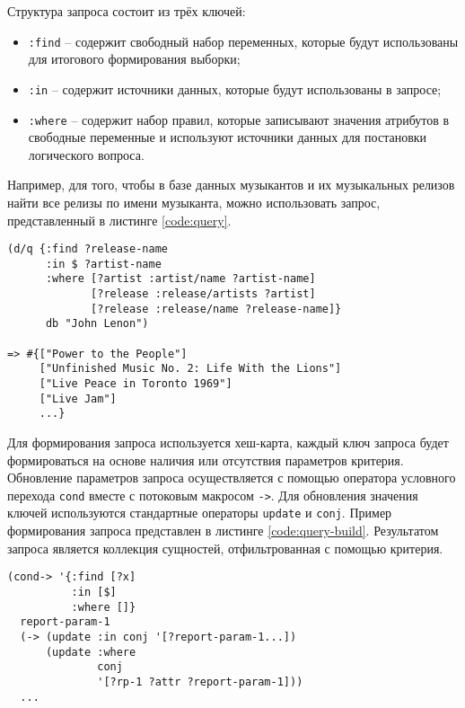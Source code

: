 Структура запроса состоит из трёх ключей:
\begin{itemize}
	\item \texttt{:find} -- содержит свободный набор переменных, которые будут использованы для итогового формирования выборки;
	\item \texttt{:in} -- содержит источники данных, которые будут использованы в запросе;
	\item \texttt{:where} -- содержит набор правил, которые записывают значения атрибутов в свободные переменные и используют источники данных для постановки логического вопроса.
\end{itemize}

Например, для того, чтобы в базе данных музыкантов и их музыкальных релизов найти все релизы по имени музыканта, можно использовать запрос, представленный в листинге \ref{code:query}. \\

\begin{lstlisting}[label=code:query, caption={Пример запроса}]
(d/q {:find ?release-name
      :in $ ?artist-name
      :where [?artist :artist/name ?artist-name]
             [?release :release/artists ?artist]
             [?release :release/name ?release-name]}
      db "John Lenon")
      
=> #{["Power to the People"] 
     ["Unfinished Music No. 2: Life With the Lions"] 
     ["Live Peace in Toronto 1969"] 
     ["Live Jam"]
     ...}
\end{lstlisting}

Для формирования запроса используется хеш-карта, каждый ключ запроса будет формироваться на основе наличия или отсутствия параметров критерия. Обновление параметров запроса осуществляется с помощью оператора условного перехода \texttt{cond} вместе с потоковым макросом\cite{threading-macro} \texttt{->}. Для обновления значения ключей используются стандартные операторы \texttt{update} и \texttt{conj}. Пример формирования запроса представлен в листинге \ref{code:query-build}. Результатом запроса является коллекция сущностей, отфильтрованная с помощью критерия.

\begin{lstlisting}[label=code:query-build, caption={Создание запроса}]
(cond-> '{:find [?x]
          :in [$]
          :where []}
  report-param-1
  (-> (update :in conj '[?report-param-1...])
      (update :where
              conj
              '[?rp-1 ?attr ?report-param-1]))
  ...
\end{lstlisting}

